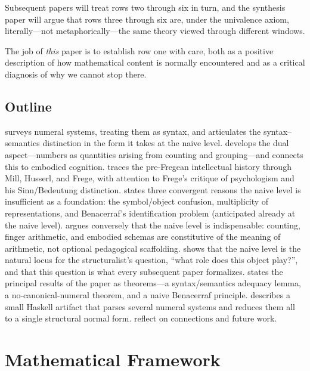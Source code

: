 \documentclass[12pt]{article}
\theoremstyle{definition}
\theoremstyle{remark}
\begin{document}
Subsequent papers will treat rows two through six in turn, and the synthesis
paper will argue that rows three through six are, under the univalence
axiom, literally---not metaphorically---the same theory viewed through
different windows.

The job of \emph{this} paper is to establish row one with care, both as a
positive description of how mathematical content is normally encountered
and as a critical diagnosis of why we cannot stop there.

\subsection{Outline}

 surveys numeral systems, treating them as syntax,
and articulates the syntax--semantics distinction in the form it takes at the
naive level.  develops the dual aspect---numbers
as quantities arising from counting and grouping---and connects this to
embodied cognition.  traces the pre-Fregean intellectual
history through Mill, Husserl, and Frege, with attention to Frege's critique
of psychologism and his Sinn/Bedeutung distinction. 
states three convergent reasons the naive level is insufficient as a
foundation: the symbol/object confusion, multiplicity of representations,
and Benacerraf's identification problem (anticipated already at the naive
level).  argues conversely that the naive level is
indispensable: counting, finger arithmetic, and embodied schemas are
constitutive of the meaning of arithmetic, not optional pedagogical scaffolding.
 shows that the naive level is the natural locus for the
structuralist's question, ``what role does this object play?'', and that
this question is what every subsequent paper formalizes.
 states the principal results of the paper as theorems---a
syntax/semantics adequacy lemma, a no-canonical-numeral theorem, and a
naive Benacerraf principle.  describes a small Haskell
artifact that parses several numeral systems and reduces them all to a
single structural normal form.  reflect
on connections and future work.

\section{Mathematical Framework}
\label{sec:framework}
\end{document}
